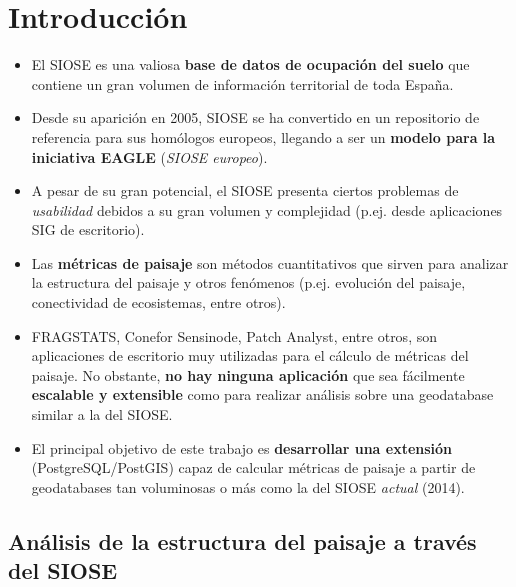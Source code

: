 
\chapter{Introducción}\label{chap:intro}

\begin{graybox}
\begin{itemize}
\item El SIOSE es una valiosa \textbf{base de datos de ocupación del suelo} que contiene un gran volumen de información territorial de toda España.
\item Desde su aparición en 2005, SIOSE se ha convertido en un repositorio de referencia para sus homólogos europeos, llegando a ser un \textbf{modelo para la iniciativa EAGLE} (\textit{SIOSE europeo}). 
\item A pesar de su gran potencial, el SIOSE presenta ciertos problemas de \textit{usabilidad} debidos a su gran volumen y complejidad (p.ej. desde aplicaciones SIG de escritorio).
\item Las \textbf{métricas de paisaje} son métodos cuantitativos que sirven para analizar la estructura del paisaje y otros fenómenos (p.ej. evolución del paisaje, conectividad de ecosistemas, entre otros).
\item FRAGSTATS, Conefor Sensinode, Patch Analyst, entre otros, son aplicaciones de escritorio muy utilizadas para el cálculo de métricas del paisaje. No obstante, \textbf{no hay ninguna aplicación} que sea fácilmente \textbf{escalable y extensible} como para realizar análisis sobre una geodatabase similar a la del SIOSE.
\item El principal objetivo de este trabajo es \textbf{desarrollar una extensión} (PostgreSQL/PostGIS) capaz de calcular métricas de paisaje a partir de geodatabases tan voluminosas o más como la del SIOSE \textit{actual} (2014).
\end{itemize}
\end{graybox}

\ifpdf
    \graphicspath{{Chapter1/Figs/Raster/}{Chapter1/Figs/PDF/}{Chapter1/Figs/}}
\else
    \graphicspath{{Chapter1/Figs/Vector/}{Chapter1/Figs/}}
\fi


\section{Análisis de la estructura del paisaje a través del SIOSE}


